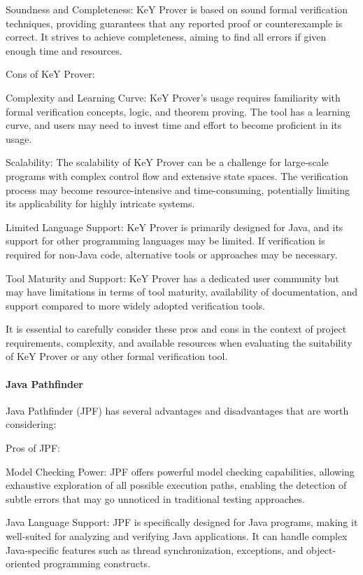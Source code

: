 Soundness and Completeness: KeY Prover is based on sound formal verification techniques, providing guarantees that any reported proof or counterexample is correct. It strives to achieve completeness, aiming to find all errors if given enough time and resources.

Cons of KeY Prover:

Complexity and Learning Curve: KeY Prover's usage requires familiarity with formal verification concepts, logic, and theorem proving. The tool has a learning curve, and users may need to invest time and effort to become proficient in its usage.

Scalability: The scalability of KeY Prover can be a challenge for large-scale programs with complex control flow and extensive state spaces. The verification process may become resource-intensive and time-consuming, potentially limiting its applicability for highly intricate systems.

Limited Language Support: KeY Prover is primarily designed for Java, and its support for other programming languages may be limited. If verification is required for non-Java code, alternative tools or approaches may be necessary.

Tool Maturity and Support: KeY Prover has a dedicated user community but may have limitations in terms of tool maturity, availability of documentation, and support compared to more widely adopted verification tools.

It is essential to carefully consider these pros and cons in the context of project requirements, complexity, and available resources when evaluating the suitability of KeY Prover or any other formal verification tool.
\paragraph{Java Pathfinder}
  
Java Pathfinder (JPF) has several advantages and disadvantages that are worth considering:

Pros of JPF:

Model Checking Power: JPF offers powerful model checking capabilities, allowing exhaustive exploration of all possible execution paths, enabling the detection of subtle errors that may go unnoticed in traditional testing approaches.

Java Language Support: JPF is specifically designed for Java programs, making it well-suited for analyzing and verifying Java applications. It can handle complex Java-specific features such as thread synchronization, exceptions, and object-oriented programming constructs.

